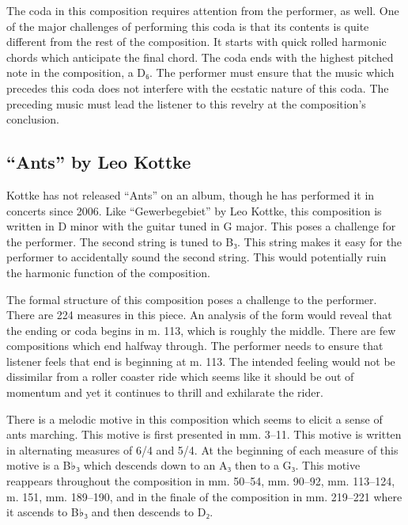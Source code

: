 \documentclass{tufte-handout}
\begin{document}
  The coda in this composition requires attention from the performer, as well. One of the major challenges of performing this coda is that its contents is quite different from the rest of the composition. It starts with quick rolled harmonic chords which anticipate the final chord. The coda ends with the highest pitched note in the composition, a D₆. The performer must ensure that the music which precedes this coda does not interfere with the ecstatic nature of this coda. The preceding music must lead the listener to this revelry at the composition's conclusion. 

\subsection*{``Ants'' by Leo Kottke}
\label{sec:ants-leo-kottke}
Kottke has not released ``Ants'' on an album, though he has performed it in concerts since 2006. Like ``Gewerbegebiet'' by Leo Kottke, this composition is written in D minor with the guitar tuned in G major. This poses a challenge for the performer. The second string is tuned to B₃. This string makes it easy for the performer to accidentally sound the second string. This would potentially ruin the harmonic function of the composition. 

The formal structure of this composition poses a challenge to the
performer. There are 224 measures in this piece. An analysis of the form would
reveal that the ending or coda begins in m. 113, which is roughly the middle. There are few compositions which end halfway through. The
performer needs to ensure that listener feels that end is beginning at m. 113. The intended feeling would not be dissimilar from a roller coaster ride which seems like it should be out of momentum and yet it continues to thrill and exhilarate the rider.

There is a melodic motive in this composition which seems to elicit a sense of ants marching. This motive is first presented in mm. 3--11. This motive is written in alternating measures of 6/4 and 5/4. At the beginning of each measure of this motive is a B♭₃ which descends down to an A₃ then to a G₃. This motive reappears throughout the composition in mm. 50--54, mm. 90--92, mm. 113--124, m. 151, mm. 189--190, and in the finale of the composition in mm. 219--221 where it ascends to B♭₃ and then descends to D₂. 
\end{document}

